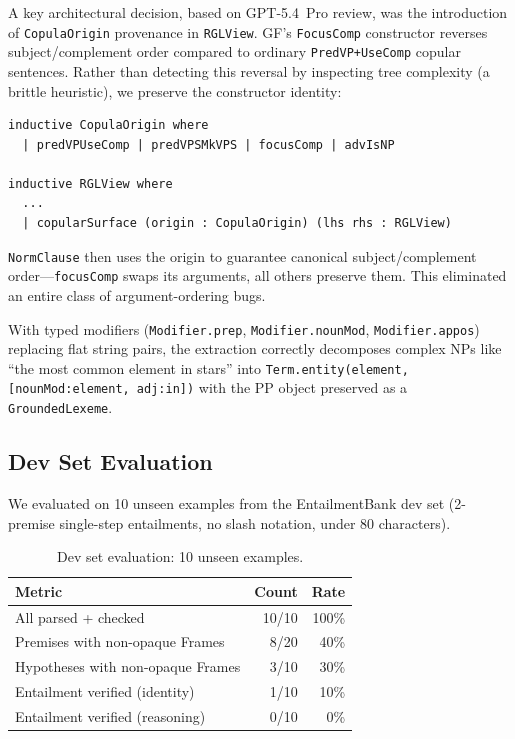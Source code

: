 \documentclass[]{article}
\newcommand{\code}[1]{\texttt{#1}}
\begin{document}
A key architectural decision, based on GPT-5.4~Pro review, was the
introduction of \code{CopulaOrigin} provenance in \code{RGLView}.
GF's \code{FocusComp} constructor reverses subject/complement order
compared to ordinary \code{PredVP+UseComp} copular sentences.
Rather than detecting this reversal by inspecting tree complexity
(a brittle heuristic), we preserve the constructor identity:

\begin{lstlisting}[language={}]
inductive CopulaOrigin where
  | predVPUseComp | predVPSMkVPS | focusComp | advIsNP

inductive RGLView where
  ...
  | copularSurface (origin : CopulaOrigin) (lhs rhs : RGLView)
\end{lstlisting}

\code{NormClause} then uses the origin to guarantee canonical
subject/complement order---\code{focusComp} swaps its arguments,
all others preserve them. This eliminated an entire class of
argument-ordering bugs.

With typed modifiers (\code{Modifier.prep}, \code{Modifier.nounMod},
\code{Modifier.appos}) replacing flat string pairs, the extraction
correctly decomposes complex NPs like ``the most common element in stars''
into \code{Term.entity(element, [nounMod:element, adj:in])} with the
PP object preserved as a \code{GroundedLexeme}.

\subsection{Dev Set Evaluation}

We evaluated on 10 unseen examples from the EntailmentBank dev set
(2-premise single-step entailments, no slash notation, under 80 characters).

\begin{table}[h]
\centering
\begin{tabular}{lrr}
\toprule
\textbf{Metric} & \textbf{Count} & \textbf{Rate} \\
\midrule
All parsed + checked & 10/10 & 100\% \\
Premises with non-opaque Frames & 8/20 & 40\% \\
Hypotheses with non-opaque Frames & 3/10 & 30\% \\
Entailment verified (identity) & 1/10 & 10\% \\
Entailment verified (reasoning) & 0/10 & 0\% \\
\bottomrule
\end{tabular}
\caption{Dev set evaluation: 10 unseen examples.}
\label{tab:deveval}
\end{table}
\end{document}
